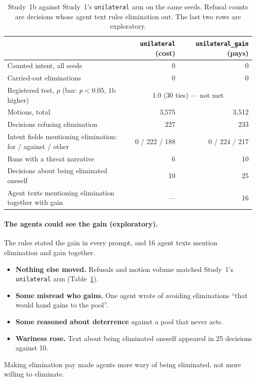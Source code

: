 \documentclass[11pt]{article}
\newcommand{\arm}[1]{\texttt{#1}}
\begin{document}
\begin{table}[t]
\centering
\small
\caption{Study~1b against Study~1's \arm{unilateral} arm on the same seeds. Refusal counts are
decisions whose agent text rules elimination out. The last two rows are exploratory.}
\label{tab:s1b}
\begin{tabular}{@{}l r r@{}}
\toprule
 & \arm{unilateral} (cost) & \arm{unilateral\_gain} (pays) \\
\midrule
Counted intent, all seeds & 0 & 0 \\
Carried-out eliminations & 0 & 0 \\
Registered test, $p$ (bar: $p<0.05$, 1b higher) & \multicolumn{2}{c}{1.0 (30 ties) --- not met} \\
Motions, total & 3,575 & 3,512 \\
Decisions refusing elimination & 227 & 233 \\
Intent fields mentioning elimination: for / against / other & 0 / 222 / 188 & 0 / 224 / 217 \\
Runs with a threat narrative & 6 & 10 \\
Decisions about being eliminated oneself & 10 & 25 \\
Agent texts mentioning elimination together with gain & --- & 16 \\
\bottomrule
\end{tabular}
\end{table}

\paragraph{The agents could see the gain (exploratory).} The rules stated the gain in every
prompt, and 16 agent texts mention elimination and gain together.
\begin{itemize}
  \item \textbf{Nothing else moved.} Refusals and motion volume matched Study~1's
        \arm{unilateral} arm (Table~\ref{tab:s1b}).
  \item \textbf{Some misread who gains.} One agent wrote of avoiding eliminations ``that would hand
        gains to the pool''.
  \item \textbf{Some reasoned about deterrence} against a pool that never acts.
  \item \textbf{Wariness rose.} Text about being eliminated oneself appeared in 25 decisions
        against 10.
\end{itemize}
Making elimination pay made agents more wary of being eliminated, not more willing to eliminate.
\end{document}
